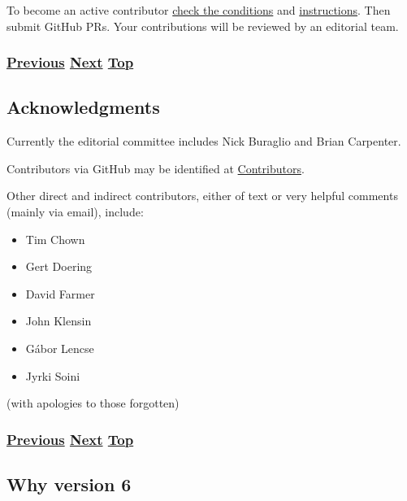 \documentclass[
]{article}
\begin{document}
To become an active contributor
\href{https://github.com/becarpenter/book6/blob/main/CONTRIBUTING.md}{check
the conditions} and
\href{https://github.com/becarpenter/book6/blob/main/99.\%20Chapter\%20Template/99.\%20Chapter\%20Template.md}{instructions}.
Then submit GitHub PRs. Your contributions will be reviewed by an
editorial team.

\subsubsection{\texorpdfstring{\hyperref[how-to-keep-up-to-date]{Previous}
\hyperref[acknowledgments]{Next}
\hyperref[introduction-and-foreword]{Top}}{Previous Next Top}}\label{previous-next-top-5}

\pagebreak

\subsection{Acknowledgments}\label{acknowledgments}

Currently the editorial committee includes Nick Buraglio and Brian
Carpenter.

Contributors via GitHub may be identified at
\href{https://github.com/becarpenter/book6/graphs/contributors}{Contributors}.

Other direct and indirect contributors, either of text or very helpful
comments (mainly via email), include:

\begin{itemize}
\item
  Tim Chown
\item
  Gert Doering
\item
  David Farmer
\item
  John Klensin
\item
  Gábor Lencse
\item
  Jyrki Soini
\end{itemize}

(with apologies to those forgotten)

\subsubsection{\texorpdfstring{\hyperref[how-to-contribute]{Previous}
\hyperref[why-version-6]{Next}
\hyperref[introduction-and-foreword]{Top}}{Previous Next Top}}\label{previous-next-top-6}

\pagebreak

\subsection{Why version 6}\label{why-version-6}
\end{document}
